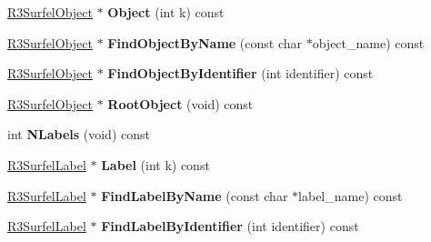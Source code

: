 \begin{DoxyCompactItemize}
\item 
\hyperlink{class_r3_surfel_object}{R3\+Surfel\+Object} $\ast$ {\bfseries Object} (int k) const \hypertarget{class_r3_surfel_scene_a0930c85684b8991f6ea996cf6f94b21c}{}\label{class_r3_surfel_scene_a0930c85684b8991f6ea996cf6f94b21c}

\item 
\hyperlink{class_r3_surfel_object}{R3\+Surfel\+Object} $\ast$ {\bfseries Find\+Object\+By\+Name} (const char $\ast$object\+\_\+name) const \hypertarget{class_r3_surfel_scene_a2d4fa33fd2990bdd2a2fc9f0100aa470}{}\label{class_r3_surfel_scene_a2d4fa33fd2990bdd2a2fc9f0100aa470}

\item 
\hyperlink{class_r3_surfel_object}{R3\+Surfel\+Object} $\ast$ {\bfseries Find\+Object\+By\+Identifier} (int identifier) const \hypertarget{class_r3_surfel_scene_acd2d381711eed1f1f23a9ef4f34f1549}{}\label{class_r3_surfel_scene_acd2d381711eed1f1f23a9ef4f34f1549}

\item 
\hyperlink{class_r3_surfel_object}{R3\+Surfel\+Object} $\ast$ {\bfseries Root\+Object} (void) const \hypertarget{class_r3_surfel_scene_a26ef482636666568bbaf6d70df9f0de1}{}\label{class_r3_surfel_scene_a26ef482636666568bbaf6d70df9f0de1}

\item 
int {\bfseries N\+Labels} (void) const \hypertarget{class_r3_surfel_scene_a1e9aa48a490fa9d5c821ca84c0fb192e}{}\label{class_r3_surfel_scene_a1e9aa48a490fa9d5c821ca84c0fb192e}

\item 
\hyperlink{class_r3_surfel_label}{R3\+Surfel\+Label} $\ast$ {\bfseries Label} (int k) const \hypertarget{class_r3_surfel_scene_a6678d7cd3a1f3995efb4ad5a8beff973}{}\label{class_r3_surfel_scene_a6678d7cd3a1f3995efb4ad5a8beff973}

\item 
\hyperlink{class_r3_surfel_label}{R3\+Surfel\+Label} $\ast$ {\bfseries Find\+Label\+By\+Name} (const char $\ast$label\+\_\+name) const \hypertarget{class_r3_surfel_scene_a778ea8f52e821415d76e94dfe87835dd}{}\label{class_r3_surfel_scene_a778ea8f52e821415d76e94dfe87835dd}

\item 
\hyperlink{class_r3_surfel_label}{R3\+Surfel\+Label} $\ast$ {\bfseries Find\+Label\+By\+Identifier} (int identifier) const \hypertarget{class_r3_surfel_scene_aa8257233ef030f9a9b859c91ac9dcd4a}{}\label{class_r3_surfel_scene_aa8257233ef030f9a9b859c91ac9dcd4a}


\end{DoxyCompactItemize}
